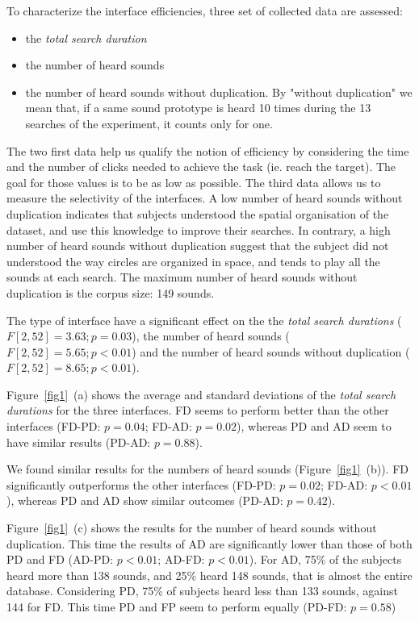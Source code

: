 \documentclass{aes2e}
\begin{document}
To characterize the interface efficiencies, three set of collected data are assessed: 

\begin{itemize}
\item the \textit{total search duration}
\item the number of heard sounds 
\item the number of heard sounds without duplication. By "without duplication" we mean that, if a same sound prototype is heard 10 times during the 13 searches of the  experiment, it counts only for one. 
\end{itemize}

The two first data help us qualify the notion of efficiency by considering the time and the number of clicks needed to achieve the task (ie. reach the target). The goal for those values is to be as low as possible. The third data allows us to measure the selectivity of the interfaces. A low number of heard sounds without duplication indicates that subjects understood the spatial organisation of the dataset, and use this knowledge to improve their searches. In contrary, a high number of heard sounds without duplication suggest that the subject did not understood the way circles are organized in space, and tends to play all the sounds at each search. The maximum number of heard sounds without duplication is the corpus size: 149 sounds.

The type of interface have a significant effect on the the \textit{total search durations} ($F[2,52]=3.63; p=0.03$), the number of heard sounds ($F[2,52]=5.65; p<0.01$) and the number of heard sounds without duplication ($F[2,52]=8.65; p<0.01$). 

Figure~\ref{fig1}~(a) shows the average and standard deviations of the \textit{total search durations} for the three interfaces. FD seems to  perform better  than the other interfaces (FD-PD: $p=0.04$; FD-AD: $p=0.02$), whereas PD and AD seem to have similar results (PD-AD: $p=0.88$).

We found similar results for the numbers of heard sounds (Figure~\ref{fig1}~(b)). FD significantly outperforms the other interfaces (FD-PD: $p=0.02$; FD-AD: $p<0.01$), whereas PD and AD show similar outcomes (PD-AD: $p=0.42$).

Figure~\ref{fig1}~(c) shows the results for the number of heard sounds without duplication. This time the results of AD are significantly lower than those of both PD and FD (AD-PD: $p<0.01$; AD-FD: $p<0.01$).  For AD, 75\% of the subjects heard more than 138 sounds, and 25\% heard 148 sounds, that is almost the entire database. Considering PD, 75\% of subjects heard  less than 133 sounds, against 144 for FD. This time PD and FP seem to perform equally (PD-FD: $p=0.58$)
\end{document}
